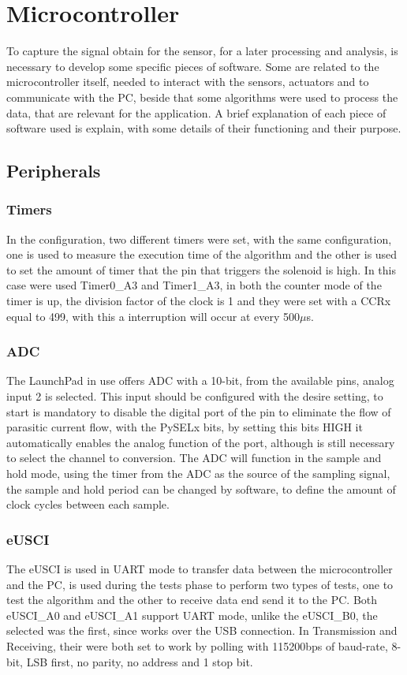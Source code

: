 \section{Microcontroller}
%
To capture the signal obtain for the sensor, for a later processing and analysis, is necessary to develop some specific pieces of software. Some are related to the microcontroller itself, needed to interact with the sensors, actuators and to communicate with the PC, beside that some algorithms were used to process the data, that are relevant for the application. A brief explanation of each piece of software used is explain, with some details of their functioning and their purpose. 
\subsection{Peripherals}
\subsubsection*{Timers}
In the configuration, two different timers were set, with the same configuration, one is used to measure the execution time of the algorithm and the other is used to set the amount of timer that the pin that triggers the solenoid is high. In this case were used Timer0\_A3 and Timer1\_A3, in both the counter mode of the timer is up, the division factor of the clock is 1 and they were set with a CCRx equal to 499, with this a interruption will occur at every 500$\mu$s.
\subsubsection*{ADC}
The LaunchPad in use offers ADC with a 10-bit, from the available pins, analog input 2 is selected. This input should be configured with the desire setting, to start is mandatory to disable the digital port of the pin to eliminate the flow of parasitic current flow, with the PySELx bits, by setting this bits HIGH it automatically enables the analog function of the port, although is still necessary to select the channel to conversion. The ADC will function in the sample and hold mode, using the timer from the ADC as the source of the sampling signal, the sample and hold period can be changed by software, to define the amount of clock cycles between each sample. 
\subsubsection*{eUSCI}
The eUSCI is used in UART mode to transfer data between the microcontroller and the PC, is used during the tests phase to perform two types of tests, one to test the algorithm and the other to receive data end send it to the PC. Both eUSCI\_A0 and eUSCI\_A1 support UART mode, unlike the eUSCI\_B0, the selected was the first, since works over the USB connection. In Transmission and Receiving, their were both set to work by polling with 115200bps of baud-rate, 8-bit, LSB first, no parity, no address and 1 stop bit.

